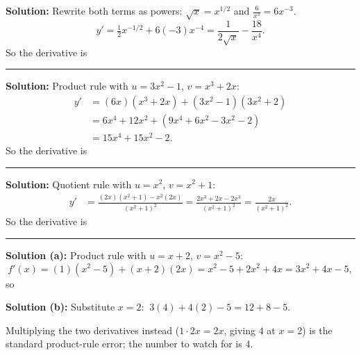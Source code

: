 \documentclass[12pt]{article}
\begin{document}

\textbf{Solution:} Rewrite both terms as powers: $\sqrt{x} = x^{1/2}$ and
$\frac{6}{x^3} = 6x^{-3}$.
\[
  y' = \tfrac{1}{2}x^{-1/2} + 6(-3)x^{-4}
     = \frac{1}{2\sqrt{x}} - \frac{18}{x^4}.
\]
So the derivative is 

\vspace{0.15cm}\noindent\rule{\linewidth}{0.2pt}\vspace{0.15cm}


\textbf{Solution:} Product rule with $u = 3x^2-1$, $v = x^3+2x$:
\begin{align*}
  y' &= (6x)\left(x^3 + 2x\right) + \left(3x^2-1\right)\left(3x^2+2\right) \\
     &= 6x^4 + 12x^2 + \left(9x^4 + 6x^2 - 3x^2 - 2\right) \\
     &= 15x^4 + 15x^2 - 2 .
\end{align*}
So the derivative is 

\vspace{0.15cm}\noindent\rule{\linewidth}{0.2pt}\vspace{0.15cm}


\textbf{Solution:} Quotient rule with $u = x^2$, $v = x^2+1$:
\begin{align*}
  y' &= \frac{(2x)\left(x^2+1\right) - x^2(2x)}{\left(x^2+1\right)^2}
      = \frac{2x^3 + 2x - 2x^3}{\left(x^2+1\right)^2}
      = \frac{2x}{\left(x^2+1\right)^2}.
\end{align*}
So the derivative is 

\vspace{0.15cm}\noindent\rule{\linewidth}{0.2pt}\vspace{0.15cm}


\textbf{Solution (a):} Product rule with $u = x+2$, $v = x^2-5$:
\[
  f'(x) = (1)\left(x^2-5\right) + (x+2)(2x) = x^2 - 5 + 2x^2 + 4x = 3x^2 + 4x - 5,
\]
so 

\textbf{Solution (b):} Substitute $x = 2$: $\ 3(4) + 4(2) - 5 = 12 + 8 - 5$.

Multiplying the two derivatives instead ($1 \cdot 2x = 2x$, giving $4$ at
$x = 2$) is the standard product-rule error; the number to watch for is $4$.
\end{document}
